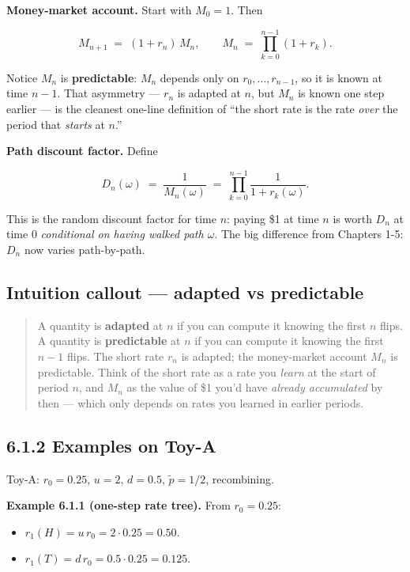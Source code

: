 \documentclass[
  10pt,
  twoside]{book}
\providecommand{\tightlist}{%
  \setlength{\itemsep}{0pt}\setlength{\parskip}{0pt}}
\begin{document}
\textbf{Money-market account.} Start with \(M_0 = 1\). Then

\[M_{n+1} \;=\; (1 + r_n)\, M_n, \qquad M_n \;=\; \prod_{k=0}^{n-1}(1 + r_k).\]

Notice \(M_n\) is \textbf{predictable}: \(M_n\) depends only on
\(r_0, \ldots, r_{n-1}\), so it is known at time \(n-1\). That asymmetry
--- \(r_n\) is adapted at \(n\), but \(M_n\) is known one step earlier
--- is the cleanest one-line definition of ``the short rate is the rate
\emph{over} the period that \emph{starts} at \(n\).''

\textbf{Path discount factor.} Define

\[D_n(\omega) \;=\; \frac{1}{M_n(\omega)} \;=\; \prod_{k=0}^{n-1} \frac{1}{1 + r_k(\omega)}.\]

This is the random discount factor for time \(n\): paying \$1 at time
\(n\) is worth \(D_n\) at time \(0\) \emph{conditional on having walked
path \(\omega\)}. The big difference from Chapters 1-5: \(D_n\) now
varies path-by-path.

\subsection{Intuition callout --- adapted vs
predictable}\label{intuition-callout-adapted-vs-predictable}

\begin{quote}
A quantity is \textbf{adapted} at \(n\) if you can compute it knowing
the first \(n\) flips. A quantity is \textbf{predictable} at \(n\) if
you can compute it knowing the first \(n-1\) flips. The short rate
\(r_n\) is adapted; the money-market account \(M_n\) is predictable.
Think of the short rate as a rate you \emph{learn} at the start of
period \(n\), and \(M_n\) as the value of \$1 you'd have \emph{already
accumulated} by then --- which only depends on rates you learned in
earlier periods.
\end{quote}

\subsection{6.1.2 Examples on Toy-A}\label{examples-on-toy-a}

Toy-A: \(r_0 = 0.25\), \(u = 2\), \(d = 0.5\), \(\tilde p = 1/2\),
recombining.

\textbf{Example 6.1.1 (one-step rate tree).} From \(r_0 = 0.25\):

\begin{itemize}
\tightlist
\item
  \(r_1(H) = u \, r_0 = 2 \cdot 0.25 = 0.50\).
\item
  \(r_1(T) = d \, r_0 = 0.5 \cdot 0.25 = 0.125\).
\end{itemize}
\end{document}

